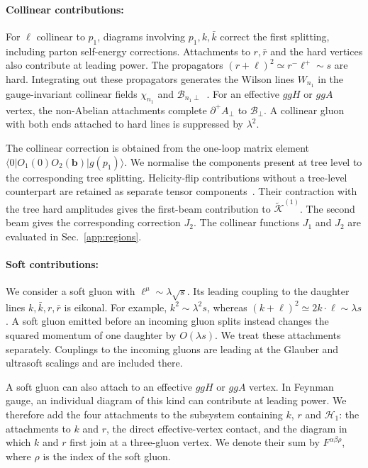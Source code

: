 \documentclass[%
 onecolumn,
 superscriptaddress,
 preprintnumbers,
 nofootinbib,
 amsmath,amssymb,
 aps,
 prl,
]{revtex4-2}
\newcommand{\bb}{\boldsymbol b}
\begin{document}
\paragraph{Collinear contributions: }
For $\ell$ collinear to $p_1$, diagrams involving
$p_1,k,\bar k$ correct the first splitting,
including parton self-energy corrections.
Attachments to $r,\bar r$ and the hard vertices
also contribute at leading power.
The propagators
$(r+\ell)^2\simeq r^-\ell^+\sim s$
are hard. Integrating out these propagators
generates the Wilson lines $W_{n_1}$
in the gauge-invariant collinear fields
$\chi_{n_1}$ and $\mathcal B_{n_1\perp}$~\cite{Bauer:2002nz}.
For an effective $ggH$ or $ggA$ vertex,
the non-Abelian attachments complete
$\partial^+A_\perp$ to $\mathcal B_\perp$.
A collinear gluon with both ends attached
to hard lines is suppressed by $\lambda^2$.

The collinear correction is obtained from
the one-loop matrix element
$\langle0|O_1(0)O_2(\bb)|g(p_1)\rangle$.
We normalise the components present at tree
level to the corresponding tree splitting.
Helicity-flip contributions without a tree-level
counterpart are retained as separate tensor
components~\cite{Bern:1999ry}.
Their contraction with the tree hard amplitudes
gives the first-beam contribution to
$\widetilde{\mathcal K}^{(1)}$.
The second beam gives the corresponding
correction $J_2$. The collinear functions
$J_1$ and $J_2$ are evaluated in
Sec.~\ref{app:regions}.

\paragraph{Soft contributions: }
We consider a soft gluon with
$\ell^\mu\sim\lambda\sqrt{s}$.
Its leading coupling to the daughter lines
$k,\bar k,r,\bar r$ is eikonal. For example,
$k^2\sim\lambda^2s$, whereas
$(k+\ell)^2\simeq2k\cdot\ell\sim\lambda s$.
A soft gluon emitted before an incoming
gluon splits instead changes the squared
momentum of one daughter by $O(\lambda s)$.
We treat these attachments separately.
Couplings to the incoming gluons are leading
at the Glauber and ultrasoft scalings and
are included there.

A soft gluon can also attach to an effective
$ggH$ or $ggA$ vertex. In Feynman gauge,
an individual diagram of this kind can
contribute at leading power. We therefore
add the four attachments to the subsystem
containing $k$, $r$ and $\mathcal H_1$:
the attachments to $k$ and $r$, the direct
effective-vertex contact, and the diagram
in which $k$ and $r$ first join at a
three-gluon vertex. We denote their sum by
$F^{\alpha\beta\rho}$, where $\rho$ is
the index of the soft gluon.
\end{document}
